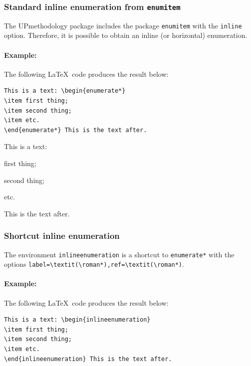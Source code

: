 \documentclass[book,taskpackage,specpackage,codepackage]{upmethodology-document}
\begin{document}
\subsubsection{Standard inline enumeration from \texttt{enumitem}}

The UPmethodology package includes the package \texttt{enumitem} with the \texttt{inline} option.
Therefore, it is possible to obtain an inline (or horizontal) enumeration.

\paragraph{Example:} The following \LaTeX~code produces the result below:
\begin{verbatim}
This is a text: \begin{enumerate*}
\item first thing;
\item second thing;
\item etc.
\end{enumerate*} This is the text after.
\end{verbatim}

This is a text: \begin{enumerate*}
\item first thing;
\item second thing;
\item etc.
\end{enumerate*} This is the text after.

\subsubsection{Shortcut inline enumeration}

The environment \texttt{inlineenumeration} is a shortcut to \texttt{enumerate*} with the options \texttt{label={\textbackslash}textit{({\textbackslash}roman*)},ref={\textbackslash}textit{({\textbackslash}roman*)}}.

\paragraph{Example:} The following \LaTeX~code produces the result below:
\begin{verbatim}
This is a text: \begin{inlineenumeration}
\item first thing;
\item second thing;
\item etc.
\end{inlineenumeration} This is the text after.
\end{verbatim}
\end{document}
